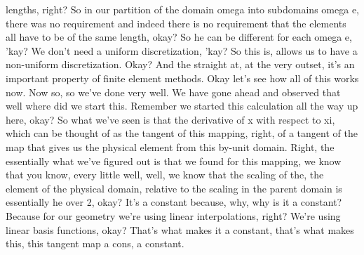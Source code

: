 \documentclass[10pt]{article}
\begin{document}
lengths, right? So in our partition of the domain omega into subdomains omega e, there was no requirement and indeed there is no requirement that the elements all have to be of the same length, okay? So he can be different for each omega e, 'kay? We don't need a uniform discretization, 'kay? So this is, allows us to have a non-uniform discretization. Okay? And the straight at, at the very outset, it's an important property of finite element methods. Okay let's see how all of this works now. Now so, so we've done very well. We have gone ahead and observed that well where did we start this. Remember we started this calculation all the way up here, okay? So what we've seen is that the derivative of x with respect to xi, which can be thought of as the tangent of this mapping, right, of a tangent of the map that gives us the physical element from this by-unit domain.  Right, the essentially what we've figured out is that we found for this mapping, we know that you know, every little well, well, we know that the scaling of the, the element of the physical domain, relative to the scaling in the parent domain is essentially he over 2, okay? It's a constant because, why, why is it a constant? Because for our geometry we're using linear interpolations, right? We're using linear basis functions, okay? That's what makes it a constant, that's what makes this, this tangent map a cons, a constant.
\end{document}
